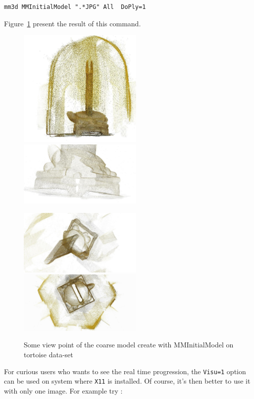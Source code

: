 \begin{verbatim}
mm3d MMInitialModel ".*JPG" All  DoPly=1
\end{verbatim}

Figure~\ref{FIG:Tortue:Output} present the result of this command.

\begin{figure}
\begin{center}
\includegraphics[width=60mm]{FIGS/Tortue/snapshot00.jpg}
\includegraphics[width=60mm]{FIGS/Tortue/snapshot01.jpg}

\includegraphics[width=60mm]{FIGS/Tortue/snapshot02.jpg}
\includegraphics[width=60mm]{FIGS/Tortue/snapshot03.jpg}
\end{center}
\caption{Some view point of the coarse model create with MMInitialModel on tortoise data-set}
\label{FIG:Tortue:Output}
\end{figure}



For curious users who wants to see the real time progression,  the {\tt Visu=1} option can be
used on system where {\tt X11} is installed. Of course, it's then better to use it with only one
image. For example try :


